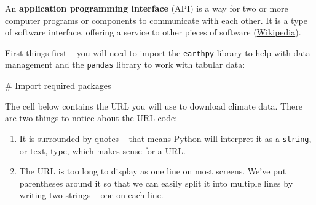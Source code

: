 \documentclass[
  letterpaper,
  DIV=11,
  numbers=noendperiod,
  oneside]{scrreprt}
\newenvironment{Shaded}{\begin{snugshade}}{\end{snugshade}}
\newcommand{\CommentTok}[1]{\textcolor[rgb]{0.37,0.37,0.37}{#1}}
\providecommand{\tightlist}{%
  \setlength{\itemsep}{0pt}\setlength{\parskip}{0pt}}
\begin{document}
\begin{tcolorbox}[enhanced jigsaw, colbacktitle=quarto-callout-note-color!10!white, opacityback=0, bottomtitle=1mm, toptitle=1mm, bottomrule=.15mm, left=2mm, colframe=quarto-callout-note-color-frame, leftrule=.75mm, opacitybacktitle=0.6, colback=white, rightrule=.15mm, toprule=.15mm, breakable, titlerule=0mm, title=\textcolor{quarto-callout-note-color}{\faInfo}\hspace{0.5em}{What's an API?}, coltitle=black, arc=.35mm]

An \textbf{application programming interface} (API) is a way for two or
more computer programs or components to communicate with each other. It
is a type of software interface, offering a service to other pieces of
software (\href{https://en.wikipedia.org/wiki/API}{Wikipedia}).

\end{tcolorbox}

First things first -- you will need to import the \texttt{earthpy}
library to help with data management and the \texttt{pandas} library to
work with tabular data:

\begin{Shaded}
\begin{Highlighting}[]
\CommentTok{\# Import required packages}
\end{Highlighting}
\end{Shaded}

The cell below contains the URL you will use to download climate data.
There are two things to notice about the URL code:

\begin{enumerate}
\def\labelenumi{\arabic{enumi}.}
\tightlist
\item
  It is surrounded by quotes -- that means Python will interpret it as a
  \texttt{string}, or text, type, which makes sense for a URL.
\item
  The URL is too long to display as one line on most screens. We've put
  parentheses around it so that we can easily split it into multiple
  lines by writing two strings -- one on each line.
\end{enumerate}
\end{document}
